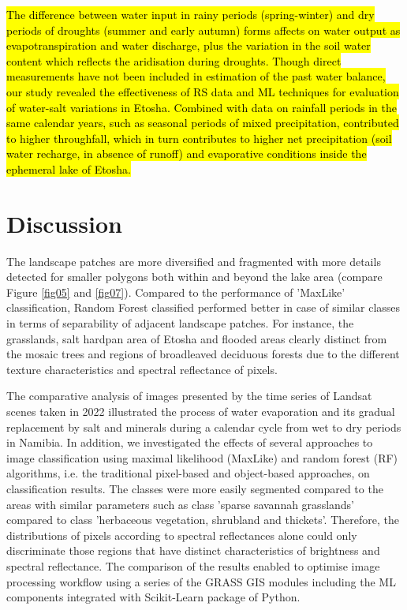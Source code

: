 \documentclass[climate,article,submit,pdftex,moreauthors]{Definitions/mdpi}
\begin{document}
\hl{The difference between water input in rainy periods (spring-winter) and dry periods of droughts (summer and early autumn) forms affects on water output as evapotranspiration and water discharge, plus the variation in the soil water content which reflects the aridisation during droughts. Though direct measurements have not been included in estimation of the past water balance, our study revealed the effectiveness of RS data and ML techniques for evaluation of water-salt variations in Etosha. Combined with data on rainfall periods in the same calendar years, such as seasonal periods of mixed precipitation, contributed to higher throughfall, which in turn contributes to higher net precipitation (soil water recharge, in absence of runoff) and evaporative conditions inside the ephemeral lake of Etosha.} 

\section{Discussion}

The landscape patches are more diversified and fragmented with more details detected for smaller polygons both within and beyond the lake area (compare Figure \ref{fig05} and \ref{fig07}). Compared to the performance of 'MaxLike' classification, Random Forest classified performed better in case of similar classes in terms of separability of adjacent landscape patches. For instance, the grasslands, salt hardpan area of Etosha and flooded areas clearly distinct from the mosaic trees and regions of broadleaved deciduous forests due to the different texture characteristics and spectral reflectance of pixels. 

The comparative analysis of images presented by the time series of Landsat scenes taken in 2022 illustrated the process of water evaporation and its gradual replacement by salt and minerals during a calendar cycle from wet to dry periods in Namibia. In addition, we investigated the effects of several approaches to image classification using maximal likelihood (MaxLike) and random forest (RF) algorithms, i.e. the traditional pixel-based and object-based approaches, on classification results. The classes were more easily segmented compared to the areas with similar parameters such as class 'sparse savannah grasslands' compared to class 'herbaceous vegetation, shrubland and thickets'. Therefore, the distributions of pixels according to spectral reflectances alone could only discriminate those regions that have distinct characteristics of brightness and spectral reflectance. The comparison of the results enabled to optimise image processing workflow using a series of the GRASS GIS modules including the ML components integrated with Scikit-Learn package of Python.
\end{document}
